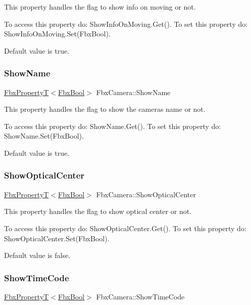 This property handles the flag to show info on moving or not.

To access this property do\+: Show\+Info\+On\+Moving.\+Get(). To set this property do\+: Show\+Info\+On\+Moving.\+Set(\+Fbx\+Bool).

Default value is true. \mbox{\label{class_fbx_camera_a2cc4a7d5d9972b289c6d1a175e2adf1d}} 
\subsubsection{\texorpdfstring{Show\+Name}{ShowName}}
{\footnotesize\ttfamily \hyperlink{class_fbx_property_t}{Fbx\+PropertyT}$<$\hyperlink{fbxtypes_8h_a92e0562b2fe33e76a242f498b362262e}{Fbx\+Bool}$>$ Fbx\+Camera\+::\+Show\+Name}

This property handles the flag to show the camera\textquotesingle{}s name or not.

To access this property do\+: Show\+Name.\+Get(). To set this property do\+: Show\+Name.\+Set(\+Fbx\+Bool).

Default value is true. \mbox{\label{class_fbx_camera_a76d80815967bce91e0fded44a6fbe74c}} 
\subsubsection{\texorpdfstring{Show\+Optical\+Center}{ShowOpticalCenter}}
{\footnotesize\ttfamily \hyperlink{class_fbx_property_t}{Fbx\+PropertyT}$<$\hyperlink{fbxtypes_8h_a92e0562b2fe33e76a242f498b362262e}{Fbx\+Bool}$>$ Fbx\+Camera\+::\+Show\+Optical\+Center}

This property handles the flag to show optical center or not.

To access this property do\+: Show\+Optical\+Center.\+Get(). To set this property do\+: Show\+Optical\+Center.\+Set(\+Fbx\+Bool).

Default value is false. \mbox{\label{class_fbx_camera_a26906a88450a20a23eef13ecec0a4871}} 
\subsubsection{\texorpdfstring{Show\+Time\+Code}{ShowTimeCode}}
{\footnotesize\ttfamily \hyperlink{class_fbx_property_t}{Fbx\+PropertyT}$<$\hyperlink{fbxtypes_8h_a92e0562b2fe33e76a242f498b362262e}{Fbx\+Bool}$>$ Fbx\+Camera\+::\+Show\+Time\+Code}

